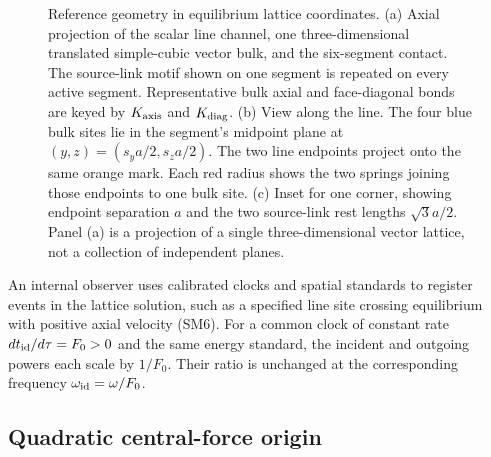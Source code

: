 \documentclass[10pt,aps,onecolumn,floatfix,notitlepage,nofootinbib,showkeys]{revtex4-2}
\begin{document}
\begin{figure}[t]
{%
}
\caption{Reference geometry in equilibrium lattice coordinates.  (a) Axial projection of the scalar line channel, one three-dimensional translated simple-cubic vector bulk, and the six-segment contact.  The source-link motif shown on one segment is repeated on every active segment.  Representative bulk axial and face-diagonal bonds are keyed by $K_{\rm axis}$ and $K_{\rm diag}$.  (b) View along the line. The four blue bulk sites lie in the segment's midpoint plane at $(y,z)=(s_y a/2,s_z a/2)$. The two line endpoints project onto the same orange mark. Each red radius shows the two springs joining those endpoints to one bulk site.  (c) Inset for one corner, showing endpoint separation $a$ and the two source-link rest lengths $\sqrt3a/2$.  Panel (a) is a projection of a single three-dimensional vector lattice, not a collection of independent planes.}
\label{fig:sectionII_geometry}
\end{figure}

An internal observer uses calibrated clocks and spatial standards to register events in the lattice solution, such as a specified line site crossing equilibrium with positive axial velocity (SM6). For a common clock of constant rate $dt_{\rm id}/d\tau=F_0>0$ and the same energy standard, the incident and outgoing powers each scale by $1/F_0$. Their ratio is unchanged at the corresponding frequency $\omega_{\rm id}=\omega/F_0$.

\subsection{Quadratic central-force origin}
\label{sec:s2-harmonic-origin}
\end{document}
